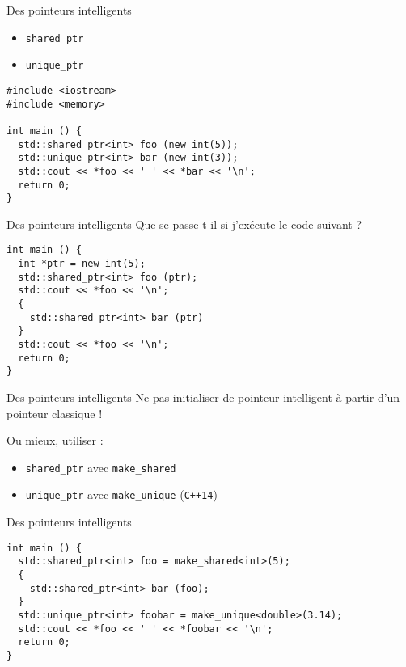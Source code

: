 \begin{frame}[fragile]{Des pointeurs intelligents}
  \begin{itemize}
  \item \texttt{shared\_ptr}
  \item \texttt{unique\_ptr}
  \end{itemize}

  \begin{lstlisting}
#include <iostream>
#include <memory>

int main () {
  std::shared_ptr<int> foo (new int(5));
  std::unique_ptr<int> bar (new int(3));
  std::cout << *foo << ' ' << *bar << '\n';
  return 0;
}
  \end{lstlisting}
\end{frame}

\begin{frame}[fragile]{Des pointeurs intelligents}
  Que se passe-t-il si j'exécute le code suivant ?

  \begin{lstlisting}
int main () {
  int *ptr = new int(5);
  std::shared_ptr<int> foo (ptr);
  std::cout << *foo << '\n';
  {
    std::shared_ptr<int> bar (ptr)
  }
  std::cout << *foo << '\n';
  return 0;
}
  \end{lstlisting}
\end{frame}

\begin{frame}{Des pointeurs intelligents}
  Ne pas initialiser de pointeur intelligent à partir d'un pointeur classique !

  Ou mieux, utiliser :
  \begin{itemize}
  \item \texttt{shared\_ptr} avec \texttt{make\_shared}
  \item \texttt{unique\_ptr} avec \texttt{make\_unique} (\texttt{C++14})
  \end{itemize}
\end{frame}

\begin{frame}[fragile]{Des pointeurs intelligents}
  \begin{lstlisting}
int main () {
  std::shared_ptr<int> foo = make_shared<int>(5);
  {
    std::shared_ptr<int> bar (foo);
  }
  std::unique_ptr<int> foobar = make_unique<double>(3.14);
  std::cout << *foo << ' ' << *foobar << '\n';
  return 0;
}
  \end{lstlisting}
\end{frame}
